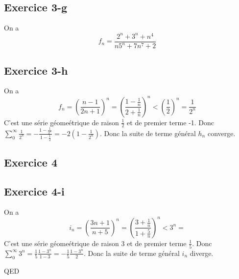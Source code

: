 \documentclass[]{book}
\theoremstyle{definition}
\begin{document}
\subsection*{Exercice 3-g}
On a 
$$f_n = \frac{2^n+3^n+n^4}{n5^n+7n^7+2}$$

\subsection*{Exercice 3-h}
On a 
$$f_n = \left( \frac{n-1}{2n+1} \right)^n = \left( \frac{1-\frac{1}{n}}{2+\frac{1}{n}} \right)^n < \left( \frac{1}{2} \right)^n = \frac{1}{2^n}$$
C'est une s\'erie g\'eome\'etrique de raison $\frac{1}{2}$ et de premier terme -1. Donc $\sum_{0}^{\infty}\frac{1}{2^n} = -\frac{1-\frac{1}{2^n}}{1-\frac{1}{2}} = -2(1-\frac{1}{2^n})$. Donc la suite de terme g\'en\'eral $h_n$ converge.

\subsection*{Exercice 4}
\subsection*{Exercice 4-i}
On a 
$$i_n = \left( \frac{3n+1}{n+5} \right)^n = \left( \frac{3+\frac{1}{n}}{1+\frac{5}{n}} \right)^n < 3^n = $$
C'est une s\'erie g\'eome\'etrique de raison $3$ et de premier terme $\frac{1}{5}$. Donc $\sum_{0}^{\infty} 3^n = \frac{1}{5}\frac{1-3^n}{1-3} = -\frac{1}{5}\frac{1-3^n}{2}$. Donc la suite de terme g\'en\'eral $i_n$ diverge.


QED
\end{document}
